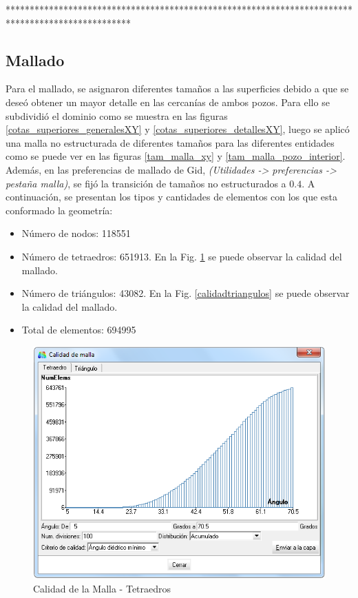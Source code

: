 \documentclass[10pt,a4paper,final]{article}
\begin{document}
**************************************************************************************************
%
\subsection{Mallado}
Para el mallado, se asignaron diferentes tamaños a las superficies debido a que se deseó obtener un mayor detalle en las cercanías de ambos pozos. Para ello se subdividió el dominio como se muestra en las figuras \ref{cotas_superiores_generalesXY} y \ref{cotas_superiores_detallesXY}, luego se aplicó una malla no estructurada de diferentes tamaños para las diferentes entidades como se puede ver en las figuras \ref{tam_malla_xy} y \ref{tam_malla_pozo_interior}. Además, en las preferencias de mallado de Gid, \emph{(Utilidades -> preferencias -> pestaña malla)}, se fijó la transición de tamaños no estructurados a $0.4$.
A continuación, se presentan los tipos y cantidades de elementos con los que esta conformado la geometría:
\begin{itemize}
\item Número de nodos: 118551
\item Número de tetraedros: 651913. En la Fig. \ref{calidadtetraedros} se puede observar la calidad del mallado.
\item Número de triángulos: 43082. En la Fig. \ref{calidadtriangulos} se puede observar la calidad del mallado.
\item Total de elementos: 694995
\end{itemize}

\begin{figure}[tbhp]
\centerline{\includegraphics[scale=0.60]{img/cant_tetraedros}}
\caption{Calidad de la Malla - Tetraedros}
\label{calidadtetraedros}
\end{figure}
\end{document}
